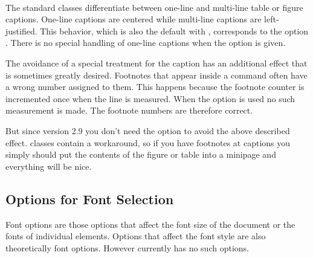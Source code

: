 \begin{Declaration}
  \\
\end{Declaration}
%
The standard classes differentiate between one-line and multi-line
table or figure captions. One-line captions are centered while
multi-line captions are left-justified. This behavior, which is also
the default with \KOMAScript, corresponds to the option
. There is no special handling of one-line
captions when the  option is given.

\begin{Explain}
  The avoidance of a special treatment for the caption has an
  additional effect that is sometimes greatly desired. Footnotes
  that appear inside a  command often have a wrong
  number assigned to them. This happens because the footnote counter
  is incremented once when the line is measured. When the
   option is used no such measurement is
  made. The footnote numbers are therefore correct.

  But since \KOMAScript{} version 2.9 you don't need the option
   to avoid the above described
  effect. \KOMAScript{} classes contain a workaround, so if you have
  footnotes at captions you simply should put the contents of the
  figure or table into a minipage and everything will be nice.
\end{Explain}
%
%
%

\subsection{Options for Font Selection}
\label{sec:maincls.fontOptions}

Font options are those options that affect the font size of the
document or the fonts of individual elements. Options that affect the
font style are also theoretically font options. However {\KOMAScript}
currently has no such options.

